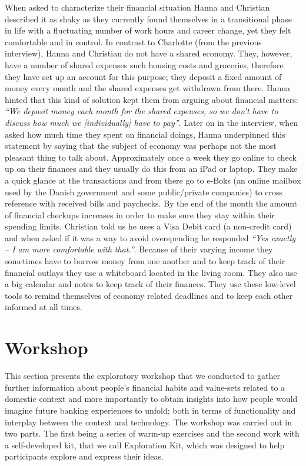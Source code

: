 When asked to characterize their financial situation Hanna and Christian described it as shaky as they currently found themselves in a transitional phase in life with a fluctuating number of work hours and career change, yet they felt comfortable and in control. In contrast to Charlotte (from the previous interview), Hanna and Christian do not have a shared economy. They, however, have a number of shared expenses such housing costs and groceries, therefore they have set up an account for this purpose; they deposit a fixed amount of money every month and the shared expenses get withdrawn from there. Hanna hinted that this kind of solution kept them from arguing about financial matters: \emph{“We deposit money each month for the shared expenses, so we don’t have to discuss how much we [individually] have to pay”}. Later on in the interview, when asked how much time they spent on financial doings, Hanna underpinned this statement by saying that the subject of economy was perhaps not the most pleasant thing to talk about. Approximately once a week they go online to check up on their finances and they usually do this from an iPad or laptop. They make a quick glance at the transactions and from there go to e-Boks (an online mailbox used by the Danish government and some public/private companies) to cross reference with received bills and paychecks. By the end of the month the amount of financial checkups increases in order to make sure they stay within their spending limits. Christian told us he uses a Visa Debit card (a non-credit card) and when asked if it was a way to avoid overspending he responded \emph{“Yes exactly -- I am more comfortable with that.”}. Because of their varying income they sometimes have to borrow money from one another and to keep track of their financial outlays they use a whiteboard located in the living room. They also use a big calendar and notes to keep track of their finances. They use these low-level tools to remind themselves of economy related deadlines and to keep each other informed at all times.

\section{Workshop}
This section presents the exploratory workshop that we conducted to gather further information about people’s financial habits and value-sets related to a domestic context and more importantly to obtain insights into how people would imagine future banking experiences to unfold; both in terms of functionality and interplay between the context and technology. The workshop was carried out in two parts. The first being a series of warm-up exercises and the second work with a self-developed kit, that we call Exploration Kit, which was designed to help participants explore and express their ideas.

